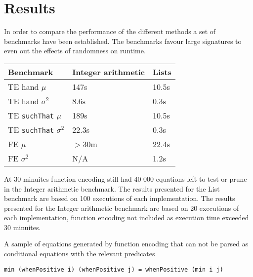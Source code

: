 \section{Results}\label{results}

In order to compare the performance of the different methods
a set of benchmarks have been established. The benchmarks favour
large signatures to even out the effects of randomness on runtime.

\begin{tabular}{|l|l|l|}
    \hline
    Benchmark                       & Integer arithmetic & Lists \\ \hline
    TE hand $\mu$                   & 147s               & 10.5s \\ \hline
    TE hand $\sigma^2$              & 8.6s               & 0.3s  \\ \hline
    TE \texttt{suchThat} $\mu$      & 189s               & 10.5s \\ \hline
    TE \texttt{suchThat} $\sigma^2$ & 22.3s              & 0.3s  \\ \hline
    FE $\mu$                        & $>$30m             & 22.4s \\ \hline
    FE $\sigma^2$                   & N/A                & 1.2s  \\ \hline
\end{tabular}

At 30 minuites function encoding still had
40 000 equations left to test or prune in the Integer arithmetic benchmark.
The results presented for the List benchmark are based on 100 executions
of each implementation.
The results presented for the Integer arithmetic benchmark are based
on 20 executions of each implementation, function encoding not included as execution
time exceeded 30 minuites.

A sample of equations generated by function encoding that can not be parsed as conditional
equations with the relevant predicates
\begin{verbatim}
min (whenPositive i) (whenPositive j) = whenPositive (min i j)
\end{verbatim}
